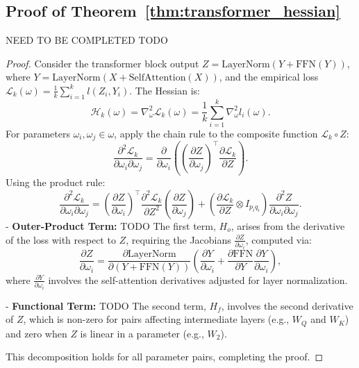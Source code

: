\documentclass{article}
\begin{document}
\subsection{Proof of Theorem~\ref{thm:transformer_hessian}}\label{app:proof_transformer_hessian}
NEED TO BE COMPLETED TODO
\begin{proof}
Consider the transformer block output \( Z = \text{LayerNorm}(Y + \text{FFN}(Y)) \), where \( Y = \text{LayerNorm}(X + \text{SelfAttention}(X)) \), and the empirical loss \( \mathcal{L}_k(\omega) = \frac{1}{k} \sum_{i=1}^k l(Z_i, Y_i) \). The Hessian is:
\[
\mathcal{H}_k(\omega) = \nabla^2_\omega \mathcal{L}_k(\omega) = \frac{1}{k} \sum_{i=1}^k \nabla^2_\omega l_i(\omega).
\]
For parameters \( \omega_i, \omega_j \in \omega \), apply the chain rule to the composite function \( \mathcal{L}_k \circ Z \):
\[
\frac{\partial^2 \mathcal{L}_k}{\partial \omega_i \partial \omega_j} = \frac{\partial}{\partial \omega_i} \left( \left( \frac{\partial Z}{\partial \omega_j} \right)^\top \frac{\partial \mathcal{L}_k}{\partial Z} \right).
\]
Using the product rule:
\[
\frac{\partial^2 \mathcal{L}_k}{\partial \omega_i \partial \omega_j} = \left( \frac{\partial Z}{\partial \omega_i} \right)^\top \frac{\partial^2 \mathcal{L}_k}{\partial Z^2} \left( \frac{\partial Z}{\partial \omega_j} \right) + \left( \frac{\partial \mathcal{L}_k}{\partial Z} \otimes I_{p_i q_i} \right) \frac{\partial^2 Z}{\partial \omega_i \partial \omega_j}.
\]
- \textbf{Outer-Product Term:} TODO The first term, \( H_o \), arises from the derivative of the loss with respect to \( Z \), requiring the Jacobians \( \frac{\partial Z}{\partial \omega_i} \), computed via:
\[
\frac{\partial Z}{\partial \omega_i} = \frac{\partial \text{LayerNorm}}{\partial (Y + \text{FFN}(Y))} \left( \frac{\partial Y}{\partial \omega_i} + \frac{\partial \text{FFN}}{\partial Y} \frac{\partial Y}{\partial \omega_i} \right),
\]
where \( \frac{\partial Y}{\partial \omega_i} \) involves the self-attention derivatives adjusted for layer normalization.

- \textbf{Functional Term:} TODO The second term, \( H_f \), involves the second derivative of \( Z \), which is non-zero for pairs affecting intermediate layers (e.g., \( W_Q \) and \( W_K \)) and zero when \( Z \) is linear in a parameter (e.g., \( W_2 \)).

This decomposition holds for all parameter pairs, completing the proof.
\end{proof}
\end{document}
